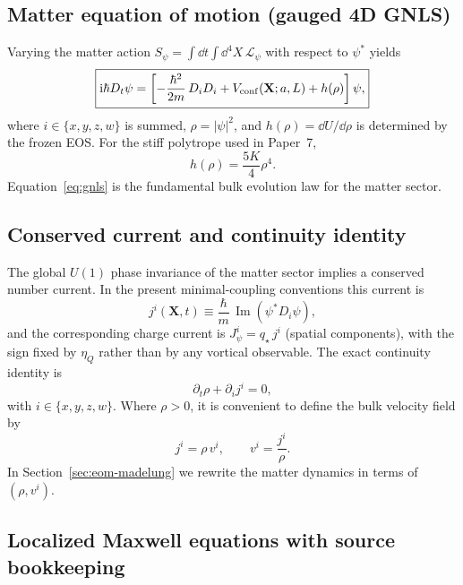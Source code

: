 \documentclass[11pt]{article}
\newcommand{\ii}{\mathrm{i}}
\newcommand{\etaQ}{\eta_Q}
\newcommand{\qstar}{q_\star}
\begin{document}
\subsection{Matter equation of motion (gauged 4D GNLS)}
\label{sec:eom-matter}

Varying the matter action $S_\psi=\int\dd t\int\dd^4X\,\mathcal L_\psi$ with respect to $\psi^*$ yields
\begin{equation}
\boxed{
\ii\hbar D_t\psi
=
\left[
-\frac{\hbar^2}{2m}\,D_iD_i
+
V_{\rm conf}(\mathbf{X};a,L)
+
h(\rho)
\right]\psi,
}
\label{eq:gnls}
\end{equation}
where $i\in\{x,y,z,w\}$ is summed, $\rho=|\psi|^2$, and $h(\rho)=\dd U/\dd\rho$ is determined by the frozen EOS. For the stiff polytrope used in Paper~7,
\begin{equation}
h(\rho)=\frac{5K}{4}\rho^4.
\end{equation}
Equation~\eqref{eq:gnls} is the fundamental bulk evolution law for the matter sector.

\subsection{Conserved current and continuity identity}
\label{sec:eom-continuity}

The global $U(1)$ phase invariance of the matter sector implies a conserved number current. In the present minimal-coupling conventions this current is
\begin{equation}
\boxed{
j^i(\mathbf{X},t)
\equiv
\frac{\hbar}{m}\,\operatorname{Im}\!\left(\psi^* D_i\psi\right),
}
\label{eq:number-current}
\end{equation}
and the corresponding charge current is $J_\psi^i=\qstar\,j^i$ (spatial components), with the sign fixed by $\etaQ$ rather than by any vortical observable. The exact continuity identity is
\begin{equation}
\boxed{
\partial_t \rho + \partial_i j^i = 0,
}
\label{eq:bulk-continuity}
\end{equation}
with $i\in\{x,y,z,w\}$. Where $\rho>0$, it is convenient to define the bulk velocity field by
\begin{equation}
j^i = \rho\,v^i,
\qquad
v^i=\frac{j^i}{\rho}.
\label{eq:bulk-velocity}
\end{equation}
In Section~\ref{sec:eom-madelung} we rewrite the matter dynamics in terms of $(\rho,v^i)$.

\subsection{Localized Maxwell equations with source bookkeeping}
\label{sec:eom-maxwell}
\end{document}
